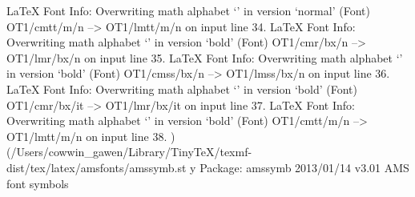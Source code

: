 LaTeX Font Info:    Overwriting math alphabet `\mathtt' in version `normal'
(Font)                  OT1/cmtt/m/n --> OT1/lmtt/m/n on input line 34.
LaTeX Font Info:    Overwriting math alphabet `\mathbf' in version `bold'
(Font)                  OT1/cmr/bx/n --> OT1/lmr/bx/n on input line 35.
LaTeX Font Info:    Overwriting math alphabet `\mathsf' in version `bold'
(Font)                  OT1/cmss/bx/n --> OT1/lmss/bx/n on input line 36.
LaTeX Font Info:    Overwriting math alphabet `\mathit' in version `bold'
(Font)                  OT1/cmr/bx/it --> OT1/lmr/bx/it on input line 37.
LaTeX Font Info:    Overwriting math alphabet `\mathtt' in version `bold'
(Font)                  OT1/cmtt/m/n --> OT1/lmtt/m/n on input line 38.
) (/Users/cowwin_gawen/Library/TinyTeX/texmf-dist/tex/latex/amsfonts/amssymb.st
y
Package: amssymb 2013/01/14 v3.01 AMS font symbols

